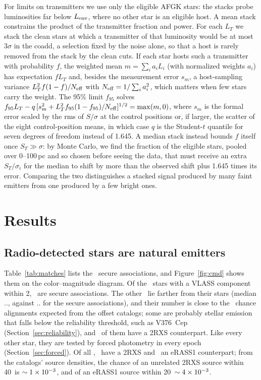 \documentclass[linenumbers]{aastex702}
\makeatletter
\newcommand{\asec}[1]{\expandafter\asec@i#1..\@nil}
\def\asec@i#1.#2.#3\@nil{\ifx\relax#2\relax#1\arcsec\else#1\farcs#2\fi}
\makeatother
\begin{document}
For limits on transmitters we use only the eligible AFGK stars: the stacks probe luminosities far below $L_{\rm env}$, where no other star is an eligible host. A mean stack constrains the product of the transmitter fraction and power. For each $L_T$ we stack the clean stars at which a transmitter of that luminosity would be at most $3\sigma$ in the coadd, a selection fixed by the noise alone, so that a host is rarely removed from the stack by the clean cuts. If each star hosts such a transmitter with probability $f$, the weighted mean $m=\sum_ia_iL_i$ (with normalized weights $a_i$) has expectation $fL_T$ and, besides the measurement error $s_m$, a host-sampling variance $L_T^2f(1-f)/N_{\rm eff}$ with $N_{\rm eff}=1/\sum_ia_i^2$, which matters when few stars carry the weight. The 95\% limit $f_{95}$ solves $f_{95}L_T-q\,[s_m^2+L_T^2f_{95}(1-f_{95})/N_{\rm eff}]^{1/2}=\max(m,0)$, where $s_m$ is the formal error scaled by the rms of $S/\sigma$ at the control positions or, if larger, the scatter of the eight control-position means, in which case $q$ is the Student-$t$ quantile for seven degrees of freedom instead of 1.645. A median stack instead bounds $f$ itself once $S_T\gg\sigma$: by Monte Carlo, we find the fraction of the eligible stars, pooled over 0--100\,pc and so chosen before seeing the data, that must receive an extra $S_T/\sigma_i$ for the median to shift by more than the observed shift plus 1.645 times its error. Comparing the two distinguishes a stacked signal produced by many faint emitters from one produced by a few bright ones.

\section{Results} \label{sec:results}

\subsection{Radio-detected stars are natural emitters} \label{sec:matches}

Table~\ref{tab:matches} lists the \NSecure\ secure associations, and Figure~\ref{fig:cmd} shows them on the color--magnitude diagram. Of the \NCand\ stars with a VLASS component within 2, \NSecure\ are secure associations. The other \NCandNonSec\ lie farther from their stars (median \asec{\NonSecSepMed}, against \asec{\SecSepMed} for the secure associations), and their number is close to the \NCandChance\ chance alignments expected from the offset catalogs; some are probably stellar emission that falls below the reliability threshold, such as V376~Cep (Section~\ref{sec:reliability}), and \NNonSecRxs\ of them have a 2RXS counterpart. Like every other star, they are tested by forced photometry in every epoch (Section~\ref{sec:forced}). Of all \NCand, \NRxs\ have a 2RXS and \NEra\ an eRASS1 counterpart; from the catalogs' source densities, the chance of an unrelated 2RXS source within 40\arcsec\ is $\sim1\times10^{-3}$, and of an eRASS1 source within 20\arcsec\ $\sim4\times10^{-3}$.
\end{document}
